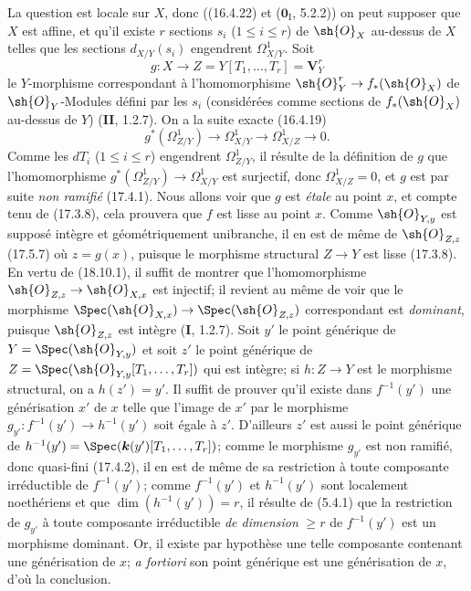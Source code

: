 La question est locale sur $X$, donc ((16.4.22) et ($\mathbf{0}_{\mathrm I}$, 5.2.2)) on peut supposer que $X$ est affine, et qu'il existe $r$ sections $s_i$ ($1\leq i\leq r$) de $\sh{O}_X$ au-dessus de $X$ telles que les sections $d_{X/Y}(s_i)$ engendrent $\varOmega^1_{X/Y}$. Soit
\[
  g:X\to Z=Y[T_1,\ldots,T_r]=\mathbf V^r_Y
\]
le $Y$-morphisme correspondant à l'homomorphisme $\sh{O}_Y^r\to f_*(\sh{O}_X)$ de $\sh{O}_Y$-Modules défini par les $s_i$ (considérées comme sections de $f_*(\sh{O}_X)$ au-dessus de $Y$) (\textbf{II}, 1.2.7). On a la suite exacte (16.4.19)
\[
  g^*(\varOmega^1_{Z/Y})\longrightarrow\varOmega^1_{X/Y}\longrightarrow\varOmega^1_{X/Z}\longrightarrow0.
\]
Comme les $dT_i$ ($1\leq i\leq r$) engendrent $\varOmega^1_{Z/Y}$, il résulte de la définition de $g$ que l'homomorphisme $g^*(\varOmega^1_{Z/Y})\to\varOmega^1_{X/Y}$ est surjectif, donc $\varOmega^1_{X/Z}=0$, et $g$ est par suite \emph{non ramifié} (17.4.1). Nous allons voir que $g$ est \emph{étale} au point $x$, et compte tenu de (17.3.8), cela prouvera que $f$ est lisse au point $x$. Comme $\sh{O}_{Y,y}$ est supposé intègre et géométriquement
unibranche, il en est de même de $\sh{O}_{Z,z}$ (17.5.7) où $z=g(x)$, puisque le morphisme structural $Z\to Y$ est lisse (17.3.8). En vertu de (18.10.1), il suffit de montrer que l'homomorphisme $\sh{O}_{Z,z}\to\sh{O}_{X,x}$ est injectif; il revient au même de voir que le morphisme $\Spec(\sh{O}_{X,x})\to\Spec(\sh{O}_{Z,z})$ correspondant est \emph{dominant}, puisque $\sh{O}_{Z,z}$ est intègre (\textbf{I}, 1.2.7).
Soit $y'$ le point générique de $Y=\Spec(\sh{O}_{Y,y})$ et soit $z'$ le point générique de $Z=\Spec(\sh{O}_{Y,y}[T_1,\ldots,T_r])$ qui est intègre; si $h:Z\to Y$ est le morphisme structural, on a $h(z')=y'$. Il suffit de prouver qu'il existe dans $f^{-1}(y')$ une générisation $x'$ de $x$ telle que l'image de $x'$ par le morphisme $g_{y'}:f^{-1}(y')\to h^{-1}(y')$ soit égale à $z'$. D'ailleurs $z'$ est aussi le point générique de $h^{-1}(y')=\Spec(\boldsymbol{k}(y')[T_1,\ldots,T_r])$; comme le morphisme $g_{y'}$ est non ramifié, donc quasi-fini (17.4.2), il en est de même de sa restriction à toute composante irréductible de $f^{-1}(y')$; comme $f^{-1}(y')$ et $h^{-1}(y')$ sont localement noethériens et que $\dim(h^{-1}(y'))=r$, il résulte de (5.4.1) que la restriction de $g_{y'}$ à toute composante irréductible \emph{de dimension} $\geq r$ de $f^{-1}(y')$ est un morphisme dominant. Or, il existe par hypothèse une telle composante contenant une générisation de $x$; \emph{a fortiori} son point générique est une générisation de $x$, d'où la conclusion.

